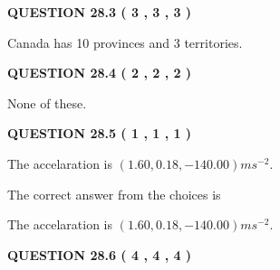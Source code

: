\documentclass[12pt]{article}
\begin{document}
{\textbf{\Large{QUESTION
28.3 
 (           3 ,           3 ,           3 )
}}}
  
  
 
 
\noindent{}
 
 
Canada has  %
10 provinces and  %
3 territories.
 
 
 
 
  
\vspace{0.2in}
  
{\textbf{\Large{QUESTION
28.4 
 (           2 ,           2 ,           2 )
}}}
  
  
 
 
\noindent{}
 
 
 None of these.
 
 
 
 
  
\vspace{0.2in}
  
{\textbf{\Large{QUESTION
28.5 
 (           1 ,           1 ,           1 )
}}}
  
  


 
 
\noindent{}
 
 
The accelaration is $  %
(
1.60,
0.18,
-140.00)
ms^{-2} $.
 
 
 
 
 
 
\noindent{}

The correct answer from the choices is


The accelaration is $  %
(
1.60,
0.18,
-140.00)
ms^{-2} $.
 
 
 
  
\vspace{0.2in}
  
{\textbf{\Large{QUESTION
28.6 
 (           4 ,           4 ,           4 )
}}}
  
  
 
 
\noindent{}
  
\end{document}
